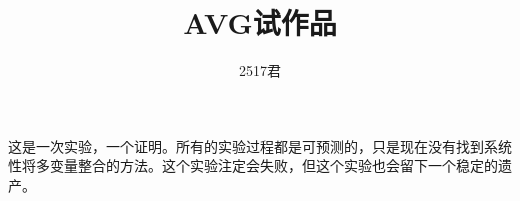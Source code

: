 \documentclass[12pt,a4paper]{report}
\title{AVG试作品}
\author{2517君}
\date{}
\begin{document}
	\tableofcontents
	\contentsname{}
	\clearpage

这是一次实验，一个证明。所有的实验过程都是可预测的，只是现在没有找到系统性将多变量整合的方法。这个实验注定会失败，但这个实验也会留下一个稳定的遗产。
	
	
	
	
\end{document}
